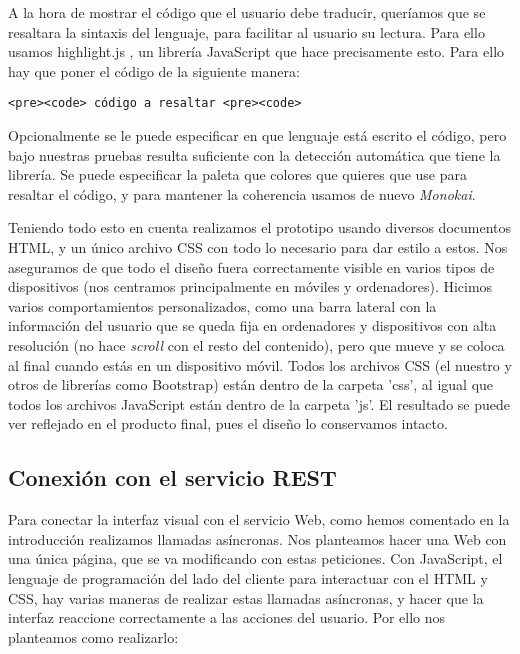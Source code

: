 \vspace{1em}
A la hora de mostrar el código que el usuario debe traducir, queríamos que se resaltara la sintaxis del lenguaje, para facilitar al usuario su lectura. Para ello usamos highlight.js \cite{highlight}, un librería JavaScript que hace precisamente esto. Para ello hay que poner el código de la siguiente manera:

{\codesize
\begin{verbatim}
<pre><code> código a resaltar <pre><code>
\end{verbatim}
}

Opcionalmente se le puede especificar en que lenguaje está escrito el código, pero bajo nuestras pruebas resulta suficiente con la detección automática que tiene la librería. Se puede especificar la paleta que colores que quieres que use para resaltar el código, y para mantener la coherencia usamos de nuevo \emph{Monokai}.

\vspace{1em}
Teniendo todo esto en cuenta realizamos el prototipo usando diversos documentos HTML, y un único archivo CSS con todo lo necesario para dar estilo a estos. Nos aseguramos de que todo el diseño fuera correctamente visible en varios tipos de dispositivos (nos centramos principalmente en móviles y ordenadores). Hicimos varios comportamientos personalizados, como una barra lateral con la información del usuario que se queda fija en ordenadores y dispositivos con alta resolución (no hace \emph{scroll} con el resto del contenido), pero que mueve y se coloca al final cuando estás en un dispositivo móvil. Todos los archivos CSS (el nuestro y otros de librerías como Bootstrap) están dentro de la carpeta 'css', al igual que todos los archivos JavaScript están dentro de la carpeta 'js'. El resultado se puede ver reflejado en el producto final, pues el diseño lo conservamos intacto.

\subsection{Conexión con el servicio REST\label{subsec:interfaz}}
Para conectar la interfaz visual con el servicio Web, como hemos comentado en la introducción realizamos llamadas asíncronas. Nos planteamos hacer una Web con una única página, que se va modificando con estas peticiones. Con JavaScript, el lenguaje de programación del lado del cliente para interactuar con el HTML y CSS, hay varias maneras de realizar estas llamadas asíncronas, y hacer que la interfaz reaccione correctamente a las acciones del usuario. Por ello nos planteamos como realizarlo:


